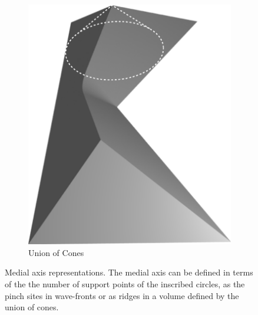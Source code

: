 \begin{figure}
\begin{subfigure}{0.3\columnwidth}
\includegraphics[height=1.5\columnwidth]{sources/method/MAT_explanation_cones.pdf}
\caption{Union of Cones}
\end{subfigure}
\caption{
Medial axis representations.
The medial axis can be defined in terms of the the number of support points of the inscribed circles,
as the pinch sites in wave-fronts
or as ridges in a volume defined by the union of cones.
}
\label{MAT_explanation}
\end{figure}


